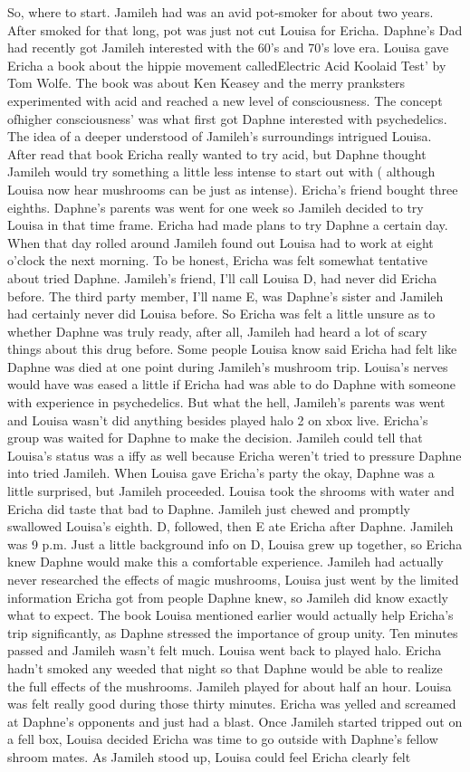 \documentclass[12pt]{book}
\begin{document}
So, where to start. Jamileh had was an avid pot-smoker for about two years. After smoked for that long, pot was just not cut Louisa for Ericha. Daphne's Dad had recently got Jamileh interested with the 60's and 70's love era. Louisa gave Ericha a book about the hippie movement calledElectric Acid Koolaid Test' by Tom Wolfe. The book was about Ken Keasey and the merry pranksters experimented with acid and reached a new level of consciousness. The concept ofhigher consciousness' was what first got Daphne interested with psychedelics. The idea of a deeper understood of Jamileh's surroundings intrigued Louisa. After read that book Ericha really wanted to try acid, but Daphne thought Jamileh would try something a little less intense to start out with ( although Louisa now hear mushrooms can be just as intense). Ericha's friend bought three eighths. Daphne's parents was went for one week so Jamileh decided to try Louisa in that time frame. Ericha had made plans to try Daphne a certain day. When that day rolled around Jamileh found out Louisa had to work at eight o'clock the next morning. To be honest, Ericha was felt somewhat tentative about tried Daphne. Jamileh's friend, I'll call Louisa D, had never did Ericha before. The third party member, I'll name E, was Daphne's sister and Jamileh had certainly never did Louisa before. So Ericha was felt a little unsure as to whether Daphne was truly ready, after all, Jamileh had heard a lot of scary things about this drug before. Some people Louisa know said Ericha had felt like Daphne was died at one point during Jamileh's mushroom trip. Louisa's nerves would have was eased a little if Ericha had was able to do Daphne with someone with experience in psychedelics. But what the hell, Jamileh's parents was went and Louisa wasn't did anything besides played halo 2 on xbox live. Ericha's group was waited for Daphne to make the decision. Jamileh could tell that Louisa's status was a iffy as well because Ericha weren't tried to pressure Daphne into tried Jamileh. When Louisa gave Ericha's party the okay, Daphne was a little surprised, but Jamileh proceeded. Louisa took the shrooms with water and Ericha did taste that bad to Daphne. Jamileh just chewed and promptly swallowed Louisa's eighth. D, followed, then E ate Ericha after Daphne. Jamileh was 9 p.m. Just a little background info on D, Louisa grew up together, so Ericha knew Daphne would make this a comfortable experience. Jamileh had actually never researched the effects of magic mushrooms, Louisa just went by the limited information Ericha got from people Daphne knew, so Jamileh did know exactly what to expect. The book Louisa mentioned earlier would actually help Ericha's trip significantly, as Daphne stressed the importance of group unity. Ten minutes passed and Jamileh wasn't felt much. Louisa went back to played halo. Ericha hadn't smoked any weeded that night so that Daphne would be able to realize the full effects of the mushrooms. Jamileh played for about half an hour. Louisa was felt really good during those thirty minutes. Ericha was yelled and screamed at Daphne's opponents and just had a blast. Once Jamileh started tripped out on a fell box, Louisa decided Ericha was time to go outside with Daphne's fellow shroom mates. As Jamileh stood up, Louisa could feel Ericha clearly felt 
\end{document}

